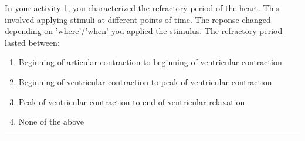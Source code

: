 \documentclass[11pt,paper=a4,answers]{exam}
\begin{document}
\begin{questions}
\question[02]
\label{Q:perunit}
In your activity 1, you characterized the refractory period of the heart. This involved applying stimuli at different points of time. The reponse changed depending on 'where'/'when' you applied the stimulus. The refractory period lasted between:
\droppoints

\begin{enumerate}[label=\alph*]
\item Beginning of articular contraction to beginning of ventricular contraction
\item Beginning of ventricular contraction to peak of ventricular contraction
\item Peak of ventricular contraction to end of ventricular relaxation
\item None of the above
\end{enumerate}

\end{questions}
\begin{center}
\rule{\textwidth}{1pt}
\end{center}
\end{document}
